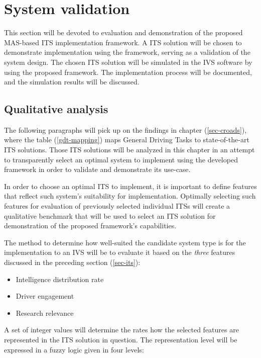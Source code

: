 \documentclass[main.tex]{subfiles}
\begin{document}
\section{System validation}

This section will be devoted to evaluation and demonstration of the proposed MAS-based ITS
implementation framework. A ITS solution will be chosen to demonstrate implementation using 
the framework, serving as a validation of the system design. The chosen ITS solution will be simulated
in the IVS software by using the proposed framework. The implementation process will be documented, 
and the simulation results will be discussed.

\subsection{Qualitative analysis}

The following paragraphs will pick up on the findings in chapter (\ref{sec-croads}), where the
table (\ref{gdt-mapping}) maps General Driving Tasks to state-of-the-art ITS solutions. Those
ITS solutions will be analyzed in this chapter in an attempt to transparently select an optimal
system to implement using the developed framework in order to validate and demonstrate its
use-case. 

In order to choose an optimal ITS to implement, it is important to define features that 
reflect such system's suitability for implementation. Optimally selecting such features 
for evaluation of previously selected individual ITSs will create a qualitative benchmark that
will be used to select an ITS solution for demonstration of the proposed framework's
capabilities.

The method to determine how well-suited the candidate system type is for the implementation to
an IVS will be to evaluate it based on the \emph{three} features discussed in the preceding
section (\ref{sec-its}): 

\begin{itemize}
    \item Intelligence distribution rate
    \item Driver engagement
    \item Research relevance
\end{itemize}

A set of integer values will determine the rates how the selected features are represented in the 
ITS solution in question. The representation level will be expressed in a fuzzy logic given in four levels:
\end{document}
